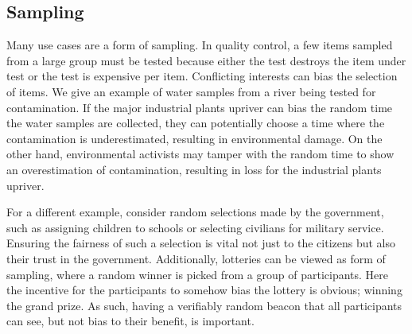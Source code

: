 \subsection{Sampling}

Many use cases are a form of sampling. In quality control, a few items sampled from a large group must be tested because either the test destroys the item under test or the test is expensive per item. Conflicting interests can bias the selection of items. We give an example of water samples from a river being tested for contamination. If the major industrial plants upriver can bias the random time the water samples are collected, they can potentially choose a time where the contamination is underestimated, resulting in environmental damage. On the other hand, environmental activists may tamper with the random time to show an overestimation of contamination, resulting in loss for the industrial plants upriver.

For a different example, consider random selections made by the government, such as assigning children to schools or selecting civilians for military service. Ensuring the fairness of such a selection is vital not just to the citizens but also their trust in the government.
Additionally, lotteries can be viewed as form of sampling, where a random winner is picked from a group of participants. Here the incentive for the participants to somehow bias the lottery is obvious; winning the grand prize. As such, having a verifiably random beacon that all participants can see, but not bias to their benefit, is important.
